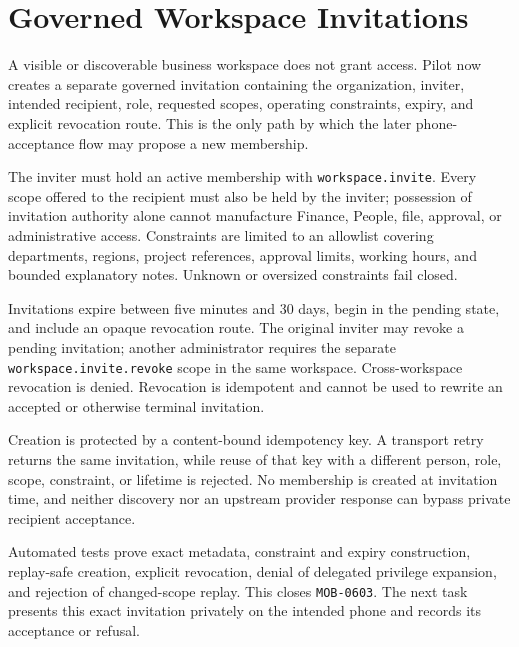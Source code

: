 \section{Governed Workspace Invitations}
\label{sec:pilot-mobile-workspace-invitations}
\raggedright

A visible or discoverable business workspace does not grant access.  Pilot now creates a
separate governed invitation containing the organization, inviter, intended recipient,
role, requested scopes, operating constraints, expiry, and explicit revocation route.
This is the only path by which the later phone-acceptance flow may propose a new
membership.

The inviter must hold an active membership with \texttt{workspace.invite}.  Every scope
offered to the recipient must also be held by the inviter; possession of invitation
authority alone cannot manufacture Finance, People, file, approval, or administrative
access.  Constraints are limited to an allowlist covering departments, regions, project
references, approval limits, working hours, and bounded explanatory notes.  Unknown or
oversized constraints fail closed.

Invitations expire between five minutes and 30 days, begin in the pending state, and
include an opaque revocation route.  The original inviter may revoke a pending invitation;
another administrator requires the separate \texttt{workspace.invite.revoke} scope in
the same workspace.  Cross-workspace revocation is denied.  Revocation is idempotent and
cannot be used to rewrite an accepted or otherwise terminal invitation.

Creation is protected by a content-bound idempotency key.  A transport retry returns the
same invitation, while reuse of that key with a different person, role, scope, constraint,
or lifetime is rejected.  No membership is created at invitation time, and neither
discovery nor an upstream provider response can bypass private recipient acceptance.

Automated tests prove exact metadata, constraint and expiry construction, replay-safe
creation, explicit revocation, denial of delegated privilege expansion, and rejection of
changed-scope replay.  This closes \texttt{MOB-0603}.  The next task presents this exact
invitation privately on the intended phone and records its acceptance or refusal.
